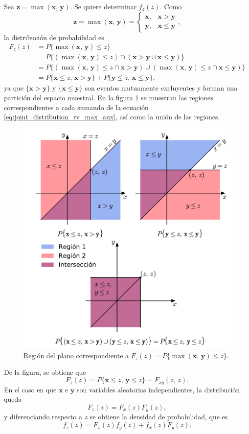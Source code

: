 \documentclass[a4paper]{report}
\newcommand{\x}{\mathbf{x}}
\newcommand{\y}{\mathbf{y}}
\newcommand{\z}{\mathbf{z}}
\begin{document}
Sea \(\z=\max(\x,\,\y)\). Se quiere determinar \(f_z(z)\). Como
\[
 \z=\max(\x,\,\y)=
 \left\{\begin{array}{ll}
  \x, & \x>\y \\
  \y, & \x\leq\y
 \end{array} \right.,
\]
la distribución de probabilidad es
\begin{align}\label{eq:joint_distribution_rv_max_aux}
 F_z(z)&=P\{\max(\x,\,\y)\leq z\}\nonumber\\
   &=P\{(\max(\x,\,\y)\leq z)\cap(\x>\y\cup\x\leq\y)\}\nonumber\\
   &=P\{(\max(\x,\,\y)\leq z\cap \x>\y)\cup(\max(\x,\,\y)\leq z\cap\x\leq\y)\}\nonumber\\
   &=P\{\x\leq z,\, \x>\y\}+P\{\y\leq z,\,\x\leq\y\},
\end{align}
ya que \(\{\x>\y\}\) y \(\{\x\leq\y\}\) son eventos mutuamente excluyentes y forman una partición del espacio muestral. En la figura \ref{fig:joint_distribution_region_rv_max} se muestran las regiones correspondientes a cada sumando de la ecuación \ref{eq:joint_distribution_rv_max_aux}, así como la unión de las regiones.
\begin{figure}[!htb]
\begin{center}
 \includegraphics[width=0.7\columnwidth]{figuras/joint_distribution_region_rv_max.pdf}
\caption{\label{fig:joint_distribution_region_rv_max} Región del plano correspondiente a \(F_z(z)=P\{\max(\x,\,\y)\leq z\}\).}
\end{center}
\end{figure}
De la figura, se obtiene que
\begin{equation}\label{eq:joint_distribution_rv_max}
 F_z(z)=P\{\x\leq z,\, \y\leq z\}=F_{xy}(z,\,z).
\end{equation}
En el caso en que \(\x\) e \(\y\) son variables aleatorias independientes, la distribución queda
\[
 F_z(z)=F_x(z)F_y(z),
\]
y diferenciando respecto a \(z\) se obtiene la densidad de probabilidad, que es
\[
 f_z(z)=F_x(z)f_y(z)+f_x(z)F_y(z).
\]
\end{document}
